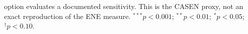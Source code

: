 \begin{table}[htpb]
\begin{minipage}{\textwidth}
option evaluates a documented sensitivity. This is the CASEN proxy, not an exact reproduction of the ENE measure. $^{***}p<0.001$; $^{**}p<0.01$; $^{*}p<0.05$; $^{\dagger}p<0.10$.
\end{minipage}
\end{table}
